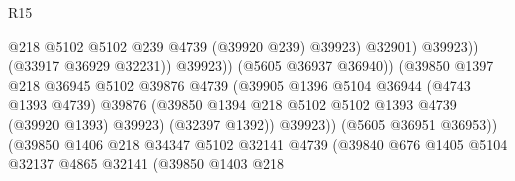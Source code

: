 \begin{lexlean}{R15}
\begin{coremodule}
{{{{{{{{{{{                                                    @218
                                                    @5102
                                                    @5102
                                                    @239
                                                    @4739
                                                    (@39920 @239)
                                                    @39923)
                                                  @32901)
                                                @39923))
                                            (@33917 @36929 @32231))
                                          @39923))
                                      (@5605 @36937 @36940))
                                    (@39850
                                      @1397
                                      @218
                                      @36945
                                      @5102
                                      @39876
                                      @4739
                                      (@39905
                                        @1396
                                        @5104
                                        @36944
                                        (@4743 @1393 @4739)
                                        @39876
                                        (@39850
                                          @1394
                                          @218
                                          @5102
                                          @5102
                                          @1393
                                          @4739
                                          (@39920 @1393)
                                          @39923)
                                        (@32397 @1392))
                                      @39923))
                                  (@5605 @36951 @36953))
                                (@39850
                                  @1406
                                  @218
                                  @34347
                                  @5102
                                  @32141
                                  @4739
                                  (@39840
                                    @676
                                    @1405
                                    @5104
                                    @32137
                                    @4865
                                    @32141
                                    (@39850
                                      @1403
                                      @218
}}}}}}}}}}}
\end{coremodule}
\end{lexlean}
